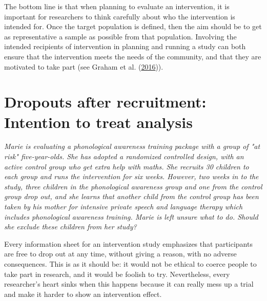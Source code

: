\documentclass{krantz}
\begin{document}
The bottom line is that when planning to evaluate an intervention, it is important for researchers to think carefully about who the intervention is intended for. Once the target population is defined, then the aim should be to get as representative a sample as possible from that population. Involving the intended recipients of intervention in planning and running a study can both ensure that the intervention meets the needs of the community, and that they are motivated to take part (see Graham et al. (\protect\hyperlink{ref-graham2016}{2016})).

\hypertarget{dropouts-after-recruitment-intention-to-treat-analysis}{%
\section{Dropouts after recruitment: Intention to treat analysis}\label{dropouts-after-recruitment-intention-to-treat-analysis}}

\begin{shaded}
\textit{Marie is evaluating a phonological awareness training package with a group of "at risk" five-year-olds. She has adopted a randomized controlled design, with an active control group who get extra help with maths. She recruits 30 children to each group and runs the intervention for six weeks. However, two weeks in to the study, three children in the phonological awareness group and one from the control group drop out, and she learns that another child from the control group has been taken by his mother for intensive private speech and language therapy which includes phonological awareness training. Marie is left unsure what to do. Should she exclude these children from her study?}
\end{shaded}

Every information sheet for an intervention study emphasizes that participants are free to drop out at any time, without giving a reason, with no adverse consequences. This is as it should be: it would not be ethical to coerce people to take part in research, and it would be foolish to try. Nevertheless, every researcher's heart sinks when this happens because it can really mess up a trial and make it harder to show an intervention effect.
\end{document}
